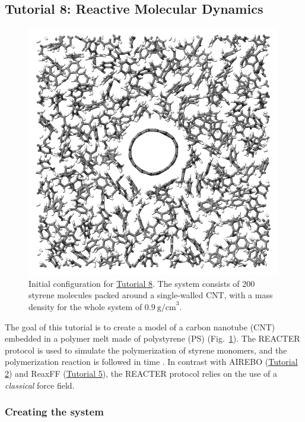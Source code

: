 \documentclass[9pt,tutorial]{livecoms}
\begin{document}
\subsection{Tutorial 8: Reactive Molecular Dynamics}
\label{bond-react-label}

\begin{figure}
\centering
\includegraphics[width=\linewidth]{REACT}
\caption{Initial configuration for \hyperref[bond-react-label]{Tutorial 8}.
The system consists of 200 styrene molecules packed around a single-walled
CNT, with a mass density for the whole system of $0.9~\text{g/cm}^3$.}
\label{fig:REACT}
\end{figure}

The goal of this tutorial is to create a model of a carbon nanotube (CNT) embedded
in a polymer melt made of polystyrene (PS) (Fig.~\ref{fig:REACT}).  The
REACTER protocol is used to simulate the polymerization of styrene monomers, and the
polymerization reaction is followed in time \cite{gissinger2017polymer, gissinger2020reacter, gissinger2024molecular}.
In contrast with AIREBO (\hyperref[carbon-nanotube-label]{Tutorial 2})
and ReaxFF (\hyperref[reactive-silicon-dioxide-label]{Tutorial 5}), the REACTER
protocol relies on the use of a \textit{classical} force field.

\subsubsection{Creating the system}
\end{document}
